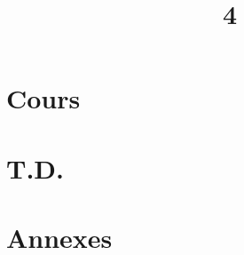 \documentclass[a4paper]{article}
\title{4}{Diagonalisation \& trigonalisation}
\begin{document}
	\part{Cours}
	
	
	
	
	
	
	
	
	
	\clearpage\null\clearpage
	\renewcommand{\thesection}{}
	\renewcommand{\thesubsection}{}
	\part{T.D.}
	
	
	
	
	
	\clearpage\null\clearpage
	\part{Annexes}
	
\end{document}
